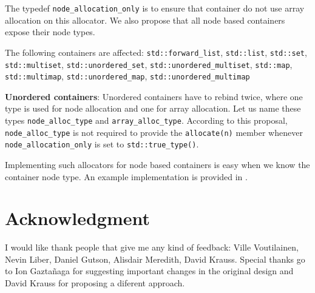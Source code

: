 \documentclass[11pt]{article}
\begin{document}
The typedef \texttt{node\_allocation\_only} is to ensure that
container do not use array allocation on this allocator.
We also propose that all node based containers expose their node types.

The following containers are affected: \texttt{std::forward\_list},
\texttt{std::list}, \texttt{std::set}, \texttt{std::multiset},
\texttt{std::unordered\_set}, \texttt{std::unordered\_multiset},
\texttt{std::map}, \texttt{std::multimap},
\texttt{std::unordered\_map}, \texttt{std::unordered\_multimap}

%
{\bf Unordered containers}: Unordered containers have to rebind twice,
where one type is used for node allocation and one for array allocation.
Let us name these types \texttt{node\_alloc\_type} and \texttt{array\_alloc\_type}.
According to this proposal, \texttt{node\_alloc\_type} is not required to
provide the \texttt{allocate(n)} member whenever \texttt{node\_allocation\_only}
is set to \texttt{std::true\_type()}.

Implementing such allocators for node based containers is easy when we know
the container node type. An example implementation is provided in \cite{rtcpp}.


\section{Acknowledgment}

I would like thank people that give me any kind of feedback: Ville Voutilainen,
Nevin Liber, Daniel Gutson, Alisdair Meredith, David Krauss. Special thanks go
to Ion Gaztañaga for suggesting important changes in the original design and David 
Krauss for proposing a diferent approach.
\end{document}
